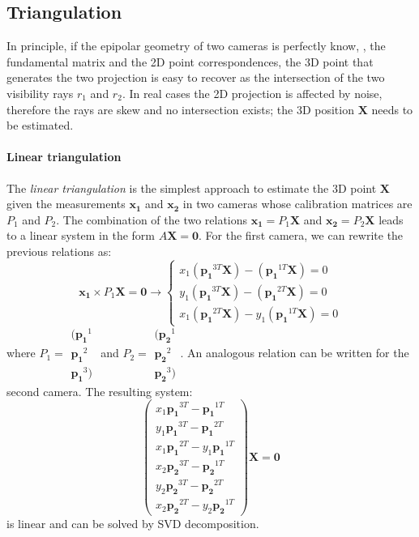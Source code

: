 \subsection{Triangulation}
In principle, if the epipolar geometry of two cameras is perfectly know, \ie, the fundamental matrix and the 2D point correspondences, the 3D point that generates the two projection is easy to recover as the intersection of the two visibility rays $r_1$ and $r_2$. 
In real cases the 2D projection is affected by noise, therefore the rays are skew and no intersection exists; the 3D position $\mathbf{X}$ needs to be estimated.

\paragraph{Linear triangulation} 
The \emph{linear triangulation} is the simplest approach to estimate the 3D point $\mathbf{X}$ given the measurements $\mathbf{x_1}$ and $\mathbf{x_2}$ in two cameras whose calibration matrices are $P_1$ and $P_2$.
The combination of the two relations $\mathbf{x_1} = P_1 \mathbf{X}$ and $\mathbf{x_2} = P_2 \mathbf{X}$ leads to a linear system in the form $A\mathbf{X} = \mathbf{0}$. 
For the first camera, we can rewrite the previous relations as:
\begin{equation}
  \mathbf{x_1} \times P_1 \mathbf{X} = \mathbf{0} \rightarrow 
  \begin{cases}
    x_1(\mathbf{p_1}^{3T}\mathbf{X}) -    (\mathbf{p_1}^{1T}\mathbf{X}) = 0\\
    y_1(\mathbf{p_1}^{3T}\mathbf{X}) -    (\mathbf{p_1}^{2T}\mathbf{X}) = 0\\
    x_1(\mathbf{p_1}^{2T}\mathbf{X}) - y_1(\mathbf{p_1}^{1T}\mathbf{X}) = 0
  \end{cases}
\end{equation}
where $P_1 = \begin{smallmatrix}(\mathbf{p_1}^1 \\ \mathbf{p_1}^2\\ \mathbf{p_1}^3)\end{smallmatrix}$ and $P_2 = \begin{smallmatrix}(\mathbf{p_2}^1 \\ \mathbf{p_2}^2\\ \mathbf{p_2}^3)\end{smallmatrix}$.
An analogous relation can be written for the second camera.
The resulting system:
\begin{equation}
  \begin{pmatrix}
    x_1\mathbf{p_1}^{3T} -    \mathbf{p_1}^{1T}\\
    y_1\mathbf{p_1}^{3T} -    \mathbf{p_1}^{2T}\\
    x_1\mathbf{p_1}^{2T} - y_1\mathbf{p_1}^{1T}\\
    x_2\mathbf{p_2}^{3T} -    \mathbf{p_2}^{1T}\\
    y_2\mathbf{p_2}^{3T} -    \mathbf{p_2}^{2T}\\
    x_2\mathbf{p_2}^{2T} - y_2\mathbf{p_2}^{1T}
  \end{pmatrix}
  \mathbf{X} = \mathbf{0}
\end{equation}
is linear and can be solved by SVD decomposition.

